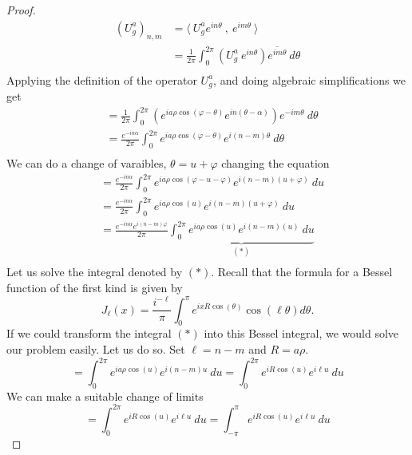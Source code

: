 \documentclass{article}
\begin{document}
\begin{proof}
    \[%
        \begin{split}
            \left(U^{a}_{g}\right)_{n,m} 
            &= \langle\  U^{a}_{g} e^{in\theta} \ , \ e^{im\theta} \ \rangle \\
            &= \frac{1}{2\pi} \int^{2\pi}_{0} \left(U^{a}_{g} \ e^{in\theta}\right) \overline{e^{im\theta}} \ d\theta \\
        \end{split}
    \]%
    Applying the definition of the operator $U^{a}_{g}$, and doing algebraic simplifications we get
    \[%
        \begin{split}
            &= \frac{1}{2\pi} \int^{2\pi}_{0} \left(e^{ia \rho \cos\left(\varphi - \theta \right)} e^{in(\theta-\alpha)}\right) {e^{-im\theta}} \ d\theta \\
            &= \frac{e^{-in\alpha}}{2\pi} \int^{2\pi}_{0} e^{ia\rho \cos\left(\varphi - \theta\right)}e^{i (n-m)\theta} \ d\theta \\
        \end{split}
    \]%
    We can do a change of varaibles, $\theta= u +\varphi$ changing the equation
    \[%
        \begin{split}
            &= \frac{e^{-in\alpha}}{2\pi} \int^{2\pi}_{0} e^{ia\rho \cos\left(\varphi-u-\varphi\right)}e^{i (n-m)(u+\varphi)} \ du\\
            &= \frac{e^{-in\alpha}}{2\pi} \int^{2\pi}_{0} e^{ia\rho \cos\left(u\right)}e^{i (n-m)(u+\varphi)} \ du\\
            &= \frac{e^{-in\alpha} e^{i(n-m)\varphi}}{2\pi} \underbrace{\int^{2\pi}_{0} e^{ia\rho \cos\left(u\right)}e^{i (n-m)(u)} \ du}_{(*)} \\
        \end{split}
    \]%
    Let us solve the integral denoted by $(*)$. Recall that the formula for a Bessel function of the first kind is given by
    \[%
        J_{\ell}(x) = \frac{i^{- \ell}}{\pi} \int^{\pi}_{0} e^{i x R \cos\left(\theta\right)} \cos\left(\ell\theta\right) d\theta
    .\]%
    If we could transform the integral $(*)$ into this Bessel integral, we would solve our problem easily. Let us do so. Set $\ell = n-m$ and $R = a\rho$.
    \[%
            = \int^{2\pi}_{0} e^{ia\rho \cos\left(u\right)} e^{i (n-m)u} \ du = \int^{2\pi}_{0} e^{iR \cos\left(u\right)} e^{i \ell u} \ du
    \]%
    We can make a suitable change of limits
    \[%
         = \int^{2\pi}_{0} e^{iR \cos\left(u\right)} e^{i \ell u} \ du = \int^{\pi}_{-\pi} e^{iR \cos\left(u\right)} e^{i \ell u} \ du
\]
\end{proof}
\end{document}
